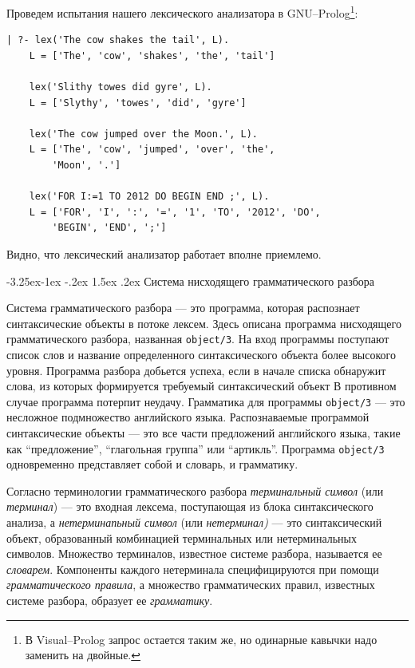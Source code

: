 \documentclass[12pt, openany, twoside]{book} %
\makeatletter
\renewcommand\subsection{\@startsection{subsection}{2}{\z@}%
                                     {-3.25ex\@plus -1ex \@minus -.2ex}%
                                     {1.5ex \@plus .2ex}%
                                     {\normalfont\normalsize\bfseries}}
\makeatother
\begin{document}
Проведем испытания нашего лексического анализатора в GNU--Prolog\footnote{В Visual--Prolog запрос остается таким же, но одинарные кавычки надо заменить на двойные.}:
{\tt\begin{verbatim}
| ?- lex('The cow shakes the tail', L).
    L = ['The', 'cow', 'shakes', 'the', 'tail']

    lex('Slithy towes did gyre', L).
    L = ['Slythy', 'towes', 'did', 'gyre']

    lex('The cow jumped over the Moon.', L).
    L = ['The', 'cow', 'jumped', 'over', 'the',
        'Moon', '.']

    lex('FOR I:=1 TO 2012 DO BEGIN END ;', L).
    L = ['FOR', 'I', ':', '=', '1', 'TO', '2012', 'DO',
        'BEGIN', 'END', ';']
\end{verbatim}}
\noindent Видно, что лексический анализатор работает вполне приемлемо.

\subsection{Система нисходящего грамматического разбора}

Система грамматического разбора --- это программа, которая распознает синтаксические объекты в потоке лексем. Здесь описана программа нисходящего грамматического разбора, названная {\tt object/3}. На вход программы поступают список слов и название определенного синтаксического объекта более высокого уровня. Программа разбора добьется успеха, если в начале списка обнаружит слова, из которых формируется требуемый синтаксический объект В противном случае программа потерпит неудачу. Грамматика для программы {\tt object/3} --- это несложное подмножество английского языка. Распознаваемые программой синтаксические объекты --- это все части предложений английского языка, такие как ``предложение'', ``глагольная группа'' или ``артикль''. Программа {\tt object/3} одновременно представляет собой и словарь, и грамматику.

Согласно терминологии грамматического разбора \emph{терминальный символ} (или \emph{терминал}) --- это входная лексема, поступающая из блока синтаксического анализа, а \emph{нетерминапьный символ} (или \emph{нетерминал)} --- это синтаксический объект, образованный комбинацией терминальных или нетерминальных символов. Множество терминалов, известное системе разбора, называется ее \emph{словарем}. Компоненты каждого нетерминала специфицируются при помощи \emph{грамматического правила}, а множество грамматических правил, известных системе разбора, образует ее \emph{грамматику}.
\end{document}
